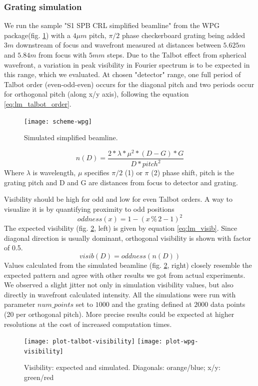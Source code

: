 \documentclass[10pt]{scrartcl}
\begin{document}
\subsubsection{Grating simulation}
We run the sample "S1 SPB CRL simplified beamline" from the WPG package(fig. \ref{fig:lm_wpg_beamline}) with a $4\mu m$ pitch, $\pi/2$ phase checkerboard grating being added $3m$ downstream of focus and wavefront measured at distances between $5.625m$ and $5.84m$ from focus with $5mm$ steps. Due to the Talbot effect from spherical wavefront, a variation in peak visibility in Fourier spectrum is to be expected in this range, which we evaluated.
At chosen "detector" range, one full period of Talbot order (even-odd-even) occurs for the diagonal pitch and two periods occur for orthogonal pitch (along x/y axis), following the equation \ref{eq:lm_talbot_order}.
%
\begin{figure}[ht]
	\begin{center}
		\texttt{[image: scheme-wpg]}
	\end{center}
	\caption{Simulated simplified beamline.}
	\label{fig:lm_wpg_beamline}
\end{figure}
%
\begin{equation}
n(D) = \frac{2* \lambda * \mu ^2 * (D-G) * G}{D * pitch ^2}
\label{eq:lm_talbot_order}
\end{equation}
Where $\lambda$ is wavelength, $\mu$ specifies $\pi/2$ (1) or $\pi$ (2) phase shift, pitch is the grating pitch and D and G are distances from focus to detector and grating.

Visibility should be high for odd and low for even Talbot orders. A way to visualize it is by quantifying proximity to odd positions%
%
\begin{equation*}
oddness(x) = 1-(x  \mathbin{\%}  2 - 1)^2
\end{equation*}
%
The expected visibility (fig. \ref{fig:lm_visib}, left) is given by equation \ref{eq:lm_visib}. Since diagonal direction is usually dominant, orthogonal visibility is shown with factor of 0.5.
%
\begin{equation}
  visib(D) = oddness\left(n(D) \right)
  \label{eq:lm_visib}
\end{equation}
%
Values calculated from the simulated beamline (fig. \ref{fig:lm_visib}, right) closely resemble the expected pattern and agree with other results we got from actual experiments.
We observed a slight jitter not only in simulation visibility values, but also directly in wavefront calculated intensity. All the simulations were run with parameter $num\_points$ set to $1000$ and the grating defined at $2000$ data points (20 per orthogonal pitch). More precise results could be expected at higher resolutions at the cost of increased computation times.
%
\begin{figure}[ht]
	\begin{center}
		\texttt{[image: plot-talbot-visibility]}
		\texttt{[image: plot-wpg-visibility]}
	\end{center}
	\caption{Visibility: expected and simulated. Diagonals: orange/blue; x/y: green/red}
	\label{fig:lm_visib}
\end{figure}
%
\FloatBarrier
%
\end{document}
